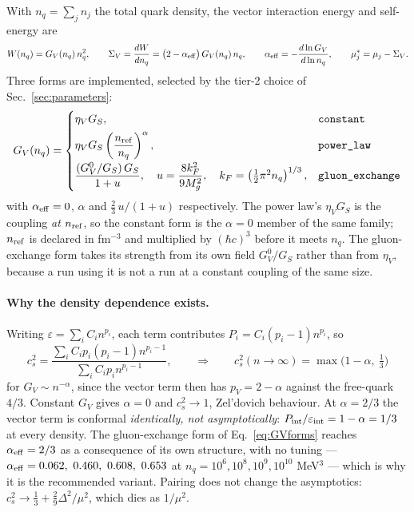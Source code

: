 \documentclass[aps,prc,onecolumn,superscriptaddress,nofootinbib,10pt]{revtex4-2}
\newcommand{\nq}{n_q}
\newcommand{\GS}{G_S}
\newcommand{\GV}{G_V}
\begin{document}
With $\nq = \sum_j n_j$ the total quark density, the vector interaction energy
and self-energy are
\begin{equation}
  W(\nq) = \GV(\nq)\,\nq^2 , \qquad
  \Sigma_V = \frac{dW}{d\nq} = \big(2 - \alpha_{\rm eff}\big)\,\GV(\nq)\,\nq ,
  \qquad
  \alpha_{\rm eff} = -\frac{d\ln \GV}{d\ln \nq} ,
  \qquad
  \mu^{*}_j = \mu_j - \Sigma_V .
  \label{eq:vector}
\end{equation}
Three forms are implemented, selected by the tier-2 choice of
Sec.~\ref{sec:parameters}:
\begin{equation}
  \GV(\nq) = \begin{cases}
    \eta_V \GS ,
      & \texttt{constant} \\[4pt]
    \eta_V \GS \left(\dfrac{n_{\rm ref}}{\nq}\right)^{\alpha} ,
      & \texttt{power\_law} \\[8pt]
    \dfrac{(\GV^0/\GS)\,\GS}{1 + u} , \quad
      u = \dfrac{8 k_F^2}{9 M_g^2} , \quad
      k_F = \left(\tfrac12 \pi^2 \nq\right)^{1/3} ,
      & \texttt{gluon\_exchange}
  \end{cases}
  \label{eq:GVforms}
\end{equation}
with $\alpha_{\rm eff} = 0$, $\alpha$ and $\tfrac23\,u/(1+u)$ respectively.
The power law's $\eta_V \GS$ is the coupling \emph{at} $n_{\rm ref}$, so the
constant form is the $\alpha = 0$ member of the same family; $n_{\rm ref}$ is
declared in fm$^{-3}$ and multiplied by $(\hbar c)^3$ before it meets $\nq$.
The gluon-exchange form takes its strength from its own field $\GV^0/\GS$
rather than from $\eta_V$, because a run using it is not a run at a constant
coupling of the same size.

\paragraph{Why the density dependence exists.} Writing
$\varepsilon = \sum_i C_i n^{p_i}$, each term contributes
$P_i = C_i (p_i-1) n^{p_i}$, so
\begin{equation}
  c_s^2 = \frac{\sum_i C_i p_i (p_i-1) n^{p_i-1}}
               {\sum_i C_i p_i n^{p_i-1}} ,
  \qquad\Longrightarrow\qquad
  c_s^2(n\to\infty) = \max\!\big(1-\alpha,\ \tfrac13\big)
\end{equation}
for $\GV \sim n^{-\alpha}$, since the vector term then has $p_V = 2-\alpha$
against the free-quark $4/3$. Constant $\GV$ gives $\alpha = 0$ and
$c_s^2 \to 1$, Zel'dovich behaviour. At $\alpha = 2/3$ the vector term is
conformal \emph{identically, not asymptotically}: $P_{\rm int}/\varepsilon_{\rm
int} = 1-\alpha = 1/3$ at every density. The gluon-exchange form of Eq.~\eqref{eq:GVforms} reaches
$\alpha_{\rm eff} = 2/3$ as a consequence of its own structure, with no tuning
--- $\alpha_{\rm eff} = 0.062,\ 0.460,\ 0.608,\ 0.653$ at
$\nq = 10^6, 10^8, 10^9, 10^{10}$ MeV$^3$ --- which is why it is the
recommended variant. Pairing does not change the asymptotics:
$c_s^2 \to \tfrac13 + \tfrac29 \Delta^2/\mu^2$, which dies as $1/\mu^2$.
\end{document}
